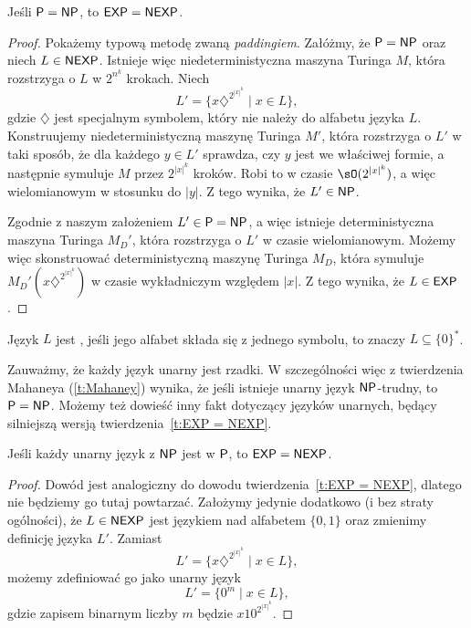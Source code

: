 \begin{theorem}\label{t:EXP = NEXP}
    Jeśli $\textsf{P} = \textsf{NP}$, to $\textsf{EXP} = \textsf{NEXP}$.
\end{theorem}
\begin{proof}
    Pokażemy typową metodę zwaną \textit{paddingiem}. Załóżmy, że $\textsf{P} = \textsf{NP}$ oraz niech $L \in \textsf{NEXP}$. Istnieje więc niedeterministyczna maszyna Turinga $M$, która rozstrzyga o $L$ w $2^{n^k}$ krokach. Niech
    \[ L' = \{x\diamondsuit^{2^{|x|^k}} \mid x \in L\}, \]
    gdzie $\diamondsuit$ jest specjalnym symbolem, który nie należy do alfabetu języka $L$. Konstruujemy niedeterministyczną maszynę Turinga $M'$, która rozstrzyga o $L'$ w taki sposób, że dla każdego $y \in L'$ sprawdza, czy $y$ jest we właściwej formie, a następnie symuluje $M$ przez $2^{|x|^k}$ kroków. Robi to w czasie $\sO(2^{|x|^k})$, a więc wielomianowym w stosunku do $|y|$. Z tego wynika, że $L' \in \textsf{NP}$.

    Zgodnie z naszym założeniem $L' \in \textsf{P} = \textsf{NP}$, a więc istnieje deterministyczna maszyna Turinga $M_D'$, która rozstrzyga o $L'$ w czasie wielomianowym. Możemy więc skonstruować deterministyczną maszynę Turinga $M_D$, która symuluje $M_D'(x\diamondsuit^{2^{|x|^k}})$ w czasie wykładniczym względem $|x|$. Z tego wynika, że $L \in \textsf{EXP}$.
\end{proof}

\begin{definition}
    Język $L$ jest , jeśli jego alfabet składa się z jednego symbolu, to znaczy $L \subseteq \{0\}^*$.
\end{definition}

Zauważmy, że każdy język unarny jest rzadki. W szczególności więc z twierdzenia Mahaneya (\ref{t:Mahaney}) wynika, że jeśli istnieje unarny język $\textsf{NP}$-trudny, to $\textsf{P} = \textsf{NP}$. Możemy też dowieść inny fakt dotyczący języków unarnych, będący silniejszą wersją twierdzenia~\ref{t:EXP = NEXP}.

\begin{theorem}
    Jeśli każdy unarny język z $\textsf{NP}$ jest w $\textsf{P}$, to $\textsf{EXP} = \textsf{NEXP}$.
\end{theorem}
\begin{proof}
    Dowód jest analogiczny do dowodu twierdzenia~\ref{t:EXP = NEXP}, dlatego nie będziemy go tutaj powtarzać. Założymy jedynie dodatkowo (i bez straty ogólności), że $L \in \textsf{NEXP}$ jest językiem nad alfabetem $\{0, 1\}$ oraz zmienimy definicję języka $L'$. Zamiast
    \[ L' = \{x\diamondsuit^{2^{|x|^k}} \mid x \in L\}, \]
    możemy zdefiniować go jako unarny język
    \[ L' = \{0^m \mid x \in L\}, \]
    gdzie zapisem binarnym liczby $m$ będzie $x10^{2^{|x|^k}}$.
\end{proof}

